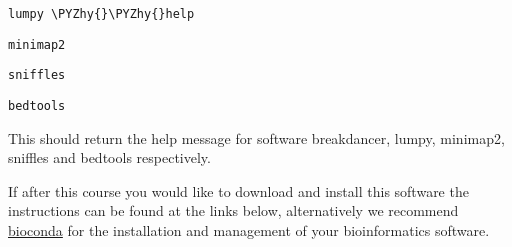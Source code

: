 \documentclass[11pt]{article}
\makeatletter
\def\PYZhy{\char`\-}
\newcommand{\boxspacing}{\kern\kvtcb@left@rule\kern\kvtcb@boxsep}
\newcommand{\prompt}[4]{
        {\ttfamily\llap{{\color{#2}[#3]:\hspace{3pt}#4}}\vspace{-\baselineskip}}
    }
\makeatother
\begin{document}
    \begin{Verbatim}[commandchars=\\\{\}, frame=single, framerule=2mm, rulecolor=\color{outerrorbackground}]
    \end{Verbatim}

    \begin{tcolorbox}[breakable, size=fbox, boxrule=1pt, pad at break*=1mm,colback=cellbackground, colframe=cellborder]
\prompt{In}{incolor}{ }{\boxspacing}
\begin{Verbatim}[commandchars=\\\{\}]
lumpy \PYZhy{}\PYZhy{}help
\end{Verbatim}
\end{tcolorbox}

    \begin{tcolorbox}[breakable, size=fbox, boxrule=1pt, pad at break*=1mm,colback=cellbackground, colframe=cellborder]
\prompt{In}{incolor}{ }{\boxspacing}
\begin{Verbatim}[commandchars=\\\{\}]
minimap2
\end{Verbatim}
\end{tcolorbox}

    \begin{tcolorbox}[breakable, size=fbox, boxrule=1pt, pad at break*=1mm,colback=cellbackground, colframe=cellborder]
\prompt{In}{incolor}{ }{\boxspacing}
\begin{Verbatim}[commandchars=\\\{\}]
sniffles
\end{Verbatim}
\end{tcolorbox}

    \begin{tcolorbox}[breakable, size=fbox, boxrule=1pt, pad at break*=1mm,colback=cellbackground, colframe=cellborder]
\prompt{In}{incolor}{ }{\boxspacing}
\begin{Verbatim}[commandchars=\\\{\}]
bedtools
\end{Verbatim}
\end{tcolorbox}

    This should return the help message for software breakdancer, lumpy,
minimap2, sniffles and bedtools respectively.

If after this course you would like to download and install this
software the instructions can be found at the links below, alternatively
we recommend \href{https://bioconda.github.io/}{bioconda} for the
installation and management of your bioinformatics software.
\end{document}
